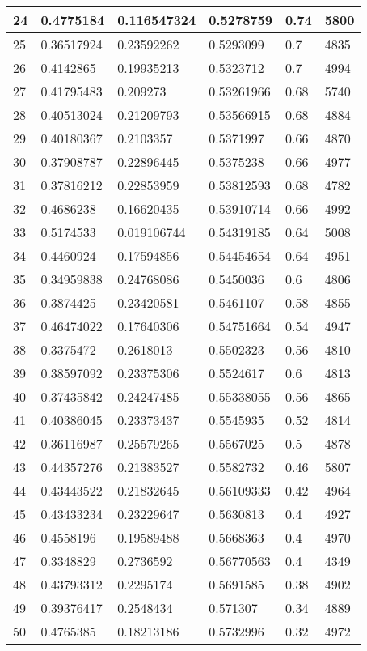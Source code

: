 \begin{longtable}{|l|l|l|l|l|l|}
24 & 0.4775184 & 0.116547324 & 0.5278759 & 0.74 & 5800 \\ \hline 
25 & 0.36517924 & 0.23592262 & 0.5293099 & 0.7 & 4835 \\ \hline 
26 & 0.4142865 & 0.19935213 & 0.5323712 & 0.7 & 4994 \\ \hline 
27 & 0.41795483 & 0.209273 & 0.53261966 & 0.68 & 5740 \\ \hline 
28 & 0.40513024 & 0.21209793 & 0.53566915 & 0.68 & 4884 \\ \hline 
29 & 0.40180367 & 0.2103357 & 0.5371997 & 0.66 & 4870 \\ \hline 
30 & 0.37908787 & 0.22896445 & 0.5375238 & 0.66 & 4977 \\ \hline 
31 & 0.37816212 & 0.22853959 & 0.53812593 & 0.68 & 4782 \\ \hline 
32 & 0.4686238 & 0.16620435 & 0.53910714 & 0.66 & 4992 \\ \hline 
33 & 0.5174533 & 0.019106744 & 0.54319185 & 0.64 & 5008 \\ \hline 
34 & 0.4460924 & 0.17594856 & 0.54454654 & 0.64 & 4951 \\ \hline 
35 & 0.34959838 & 0.24768086 & 0.5450036 & 0.6 & 4806 \\ \hline 
36 & 0.3874425 & 0.23420581 & 0.5461107 & 0.58 & 4855 \\ \hline 
37 & 0.46474022 & 0.17640306 & 0.54751664 & 0.54 & 4947 \\ \hline 
38 & 0.3375472 & 0.2618013 & 0.5502323 & 0.56 & 4810 \\ \hline 
39 & 0.38597092 & 0.23375306 & 0.5524617 & 0.6 & 4813 \\ \hline 
40 & 0.37435842 & 0.24247485 & 0.55338055 & 0.56 & 4865 \\ \hline 
41 & 0.40386045 & 0.23373437 & 0.5545935 & 0.52 & 4814 \\ \hline 
42 & 0.36116987 & 0.25579265 & 0.5567025 & 0.5 & 4878 \\ \hline 
43 & 0.44357276 & 0.21383527 & 0.5582732 & 0.46 & 5807 \\ \hline 
44 & 0.43443522 & 0.21832645 & 0.56109333 & 0.42 & 4964 \\ \hline 
45 & 0.43433234 & 0.23229647 & 0.5630813 & 0.4 & 4927 \\ \hline 
46 & 0.4558196 & 0.19589488 & 0.5668363 & 0.4 & 4970 \\ \hline 
47 & 0.3348829 & 0.2736592 & 0.56770563 & 0.4 & 4349 \\ \hline 
48 & 0.43793312 & 0.2295174 & 0.5691585 & 0.38 & 4902 \\ \hline 
49 & 0.39376417 & 0.2548434 & 0.571307 & 0.34 & 4889 \\ \hline 
50 & 0.4765385 & 0.18213186 & 0.5732996 & 0.32 & 4972 \\ \hline 
\end{longtable}